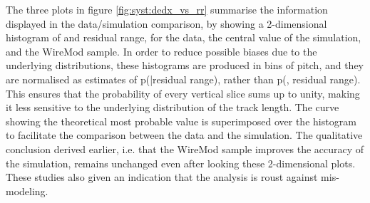 The three plots in figure \ref{fig:syst:dedx_vs_rr} summarise the information displayed in the \dqdx data/simulation comparison, by showing a 2-dimensional histogram of \dqdx and residual range, for the data, the central value of the simulation, and the WireMod \dedx sample.
In order to reduce possible biases due to the underlying distributions, these histograms are produced in bins of pitch, and they are normalised as estimates of p(\dqdx|residual range), rather than p(\dqdx, residual range).
This ensures that the probability of every vertical slice sums up to unity, making it less sensitive to the underlying distribution of the track length.
The curve showing the theoretical most probable value is superimposed over the histogram to facilitate the comparison between the data and the simulation.
The qualitative conclusion derived earlier, i.e. that the WireMod \dedx sample improves the accuracy of the simulation, remains unchanged even after looking these 2-dimensional plots. These studies also given an indication that the analysis is roust against \dedx mis-modeling.

